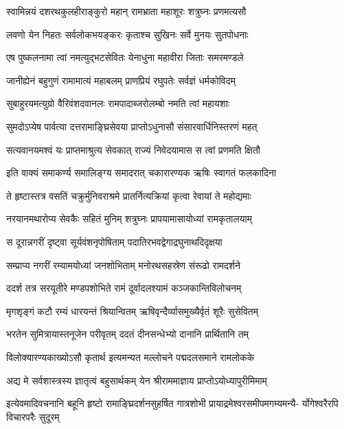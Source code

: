 \twolineshloka
{स्वामिन्नयं दशरथकुलहीराङ्कुरो महान्}
{रामभ्राता महाशूरः शत्रुघ्नः प्रणमत्यसौ}%

\twolineshloka
{लवणो येन निहतः सर्वलोकभयङ्करः}
{कृताश्च सुखिनः सर्वे मुनयः सुतपोधनाः}%

\twolineshloka
{एष पुष्कलनामा त्वां नमत्युद्भटसेवितः}
{येनाधुना महावीरा जिताः समरमण्डले}%

\twolineshloka
{जानीह्येनं बहुगुणं रामामात्यं महाबलम्}
{प्राणप्रियं रघुपतेः सर्वज्ञं धर्मकोविदम्}%

\twolineshloka
{सुबाहुरयमत्युग्रो वैरिवंशदवानलः}
{रामपादाब्जरोलम्बो नमति त्वां महायशाः}%

\twolineshloka
{सुमदोऽप्येष पार्वत्या दत्तरामाङ्घ्रिसेवया}
{प्राप्तोऽधुनासौ संसारवार्धिनिस्तरणं महत्}%

\twolineshloka
{सत्यवानयमश्वं यः प्राप्तमाश्रुत्य सेवकात्}
{राज्यं निवेदयामास स त्वां प्रणमति क्षितौ}%

\twolineshloka
{इति वाक्यं समाकर्ण्य समालिङ्ग्य समादरात्}
{चकारारण्यक ऋषिः स्वागतं फलकादिना}%

\twolineshloka
{ते हृष्टास्तत्र वसतिं चक्रुर्मुनिवराश्रमे}
{प्रातर्नित्यक्रियां कृत्वा रेवायां ते महोद्यमाः}%

\twolineshloka
{नरयानमथारोप्य सेवकैः सहितं मुनिम्}
{शत्रुघ्नः प्रापयामासायोध्यां रामकृतालयाम्}%

\twolineshloka
{स दूरान्नगरीं दृष्ट्वा सूर्यवंशनृपोषिताम्}
{पदातिरभवद्वेगाद्रघुनाथदिदृक्षया}%

\twolineshloka
{सम्प्राप्य नगरीं रम्यामयोध्यां जनशोभिताम्}
{मनोरथसहस्रेण संरूढो रामदर्शने}%

\twolineshloka
{ददर्श तत्र सरयूतीरे मण्डपशोभिते}
{रामं दूर्वादलश्यामं कञ्जकान्तिविलोचनम्}%

\twolineshloka
{मृगशृङ्गं कटौ रम्यं धारयन्तं श्रियान्वितम्}
{ऋषिवृन्दैर्व्यासमुख्यैर्वृतं शूरैः सुसेवितम्}%

\twolineshloka
{भरतेन सुमित्रायास्तनूजेन परीवृतम्}
{ददतं दीनसन्धेभ्यो दानानि प्रार्थितानि तम्}%

\twolineshloka
{विलोक्यारण्यकाख्योऽसौ कृतार्थ इत्यमन्यत}
{मल्लोचने पद्मदलसमाने रामलोकके}%

\twolineshloka
{अद्य मे सर्वशास्त्रस्य ज्ञातृत्वं बहुसार्थकम्}
{येन श्रीराममाज्ञाय प्राप्तोऽयोध्यापुरीमिमाम्}%

\fourlineindentedshloka
{इत्येवमादिवचनानि बहूनि हृष्टो}
{रामाङ्घ्रिदर्शनसुहर्षित गात्रशोभी}
{प्रायाद्रमेश्वरसमीपमगम्यमन्यै-}
{र्योगेश्वरैरपि विचारपरैः सुदूरम्}%

